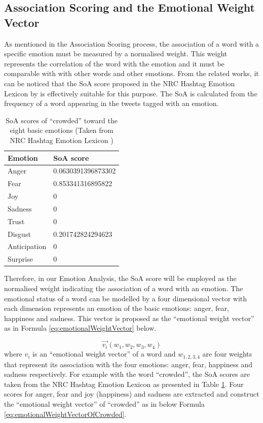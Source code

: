 \subsection{Association Scoring and the Emotional Weight Vector}
As mentioned in the Association Scoring process, the association of a word with a specific emotion must be measured by a normalised weight. This weight represents the correlation of the word with the emotion and it must be comparable with with other words and other emotions. From the related works, it can be noticed that the SoA score proposed in the NRC Hashtag Emotion Lexicon by \citet{mohammad2014using} is effectively suitable for this purpose. The SoA is calculated from the frequency of a word appearing in the tweets tagged with an emotion.

\begin{table}
\caption{SoA scores of ``crowded'' toward the eight basic emotions (Taken from NRC Hashtag Emotion Lexicon \citep{mohammad2014using})}
\label{table:soaOfCrowded}
\centering
\begin{tabular}{|l|l|}
\hline
\textbf{Emotion} & \textbf{SoA score} \\ \hline \hline
Anger & 0.0630391396873302 \\ \hline
Fear & 0.853341316895822 \\ \hline
Joy & 0 \\ \hline
Sadness & 0 \\ \hline
Trust & 0 \\ \hline
Disgust & 0.201742824294623 \\ \hline
Anticipation & 0 \\ \hline
Surprise & 0 \\ \hline
\end{tabular}
\end{table}

Therefore, in our Emotion Analysis, the SoA score will be employed as the normalised weight indicating the association of a word with an emotion. The emotional status of a word can be modelled by a four dimensional vector with each dimension represents an emotion of the basic emotions: anger, fear, happiness and sadness. This vector is proposed as the ``emotional weight vector'' as in Formula \ref{eq:emotionalWeightVector} below.

\begin{equation}
\label{eq:emotionalWeightVector}
	\vec{v_i}(w_1, w_2, w_3, w_4)
\end{equation}
where \(v_i\) is an ``emotional weight vector'' of a word and \(w_{1,2,3,4}\) are four weights that represent its association with the four emotions: anger, fear, happiness and sadness respectively. For example with the word ``crowded'', the SoA scores are taken from the NRC Hashtag Emotion Lexicon as presented in Table \ref{table:soaOfCrowded}. Four scores for anger, fear and joy (happiness) and sadness are extracted and construct the ``emotional weight vector'' of ``crowded'' as in below Formula \ref{eq:emotionalWeightVectorOfCrowded}.

